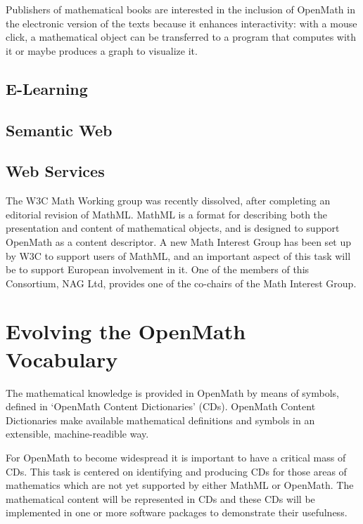 \documentclass{euproposal}
\begin{document}
Publishers of mathematical books are interested in the inclusion of
OpenMath in the electronic version of the texts because it enhances
interactivity: with a mouse click, a mathematical object can be
transferred to a program that computes with it or maybe produces a
graph to visualize it. 

\subsection{E-Learning}
\label{sec:e-learn}


\subsection{Semantic Web}
\label{sec:semw}


\subsection{Web Services}
\label{sec:ws}





The W3C Math Working group was recently dissolved, after completing an
editorial revision of MathML.  MathML is a format for describing both
the presentation and content of mathematical objects, and is designed
to support OpenMath as a content descriptor.  A new Math Interest
Group has been set up by W3C to support users of MathML, and an
important aspect of this task will be to support European involvement
in it.  One of the members of this Consortium, NAG Ltd, provides one
of the co-chairs of the Math Interest Group.

\section{Evolving the OpenMath Vocabulary}
\label{sec:OCD}

The mathematical knowledge is provided in OpenMath by means of
symbols, defined in `OpenMath Content Dictionaries' (CDs).  OpenMath
Content Dictionaries make available mathematical definitions and
symbols in an extensible, machine-readible way.

For OpenMath to become widespread it is important to have a critical
mass of CDs. This task is centered on identifying and producing CDs
for those areas of mathematics which are not yet supported by either
MathML or OpenMath. The mathematical content will be represented in
CDs and these CDs will be implemented in one or more software packages
to demonstrate their usefulness.
\end{document}
